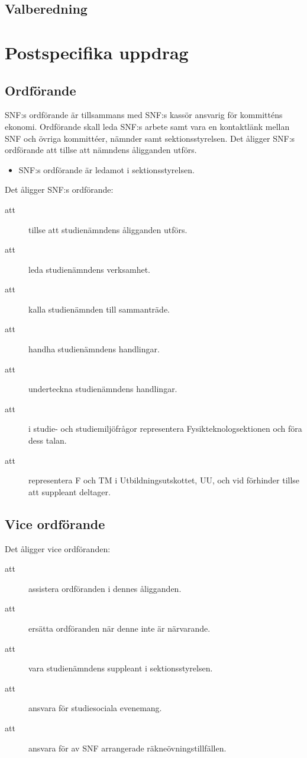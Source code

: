 \documentclass[a4paper]{article}
\begin{document}
\begin{foreningenv}{\forening{}}
    \subsection{Valberedning}
    \aliggvalber{}
    
    \section{Postspecifika uppdrag}
    \subsection{Ordförande}
    SNF:s ordförande är tillsammans med SNF:s kassör ansvarig för kommitténs ekonomi. Ordförande skall leda SNF:s arbete samt vara en kontaktlänk mellan SNF och övriga kommittéer, nämnder samt sektionsstyrelsen. Det åligger SNF:s ordförande att tillse att nämndens åligganden utförs.\\
    
    \begin{itemize}
        \item SNF:s ordförande är ledamot i sektionsstyrelsen.
    \end{itemize}
    
    Det åligger SNF:s ordförande:
    \begin{description}
        \item[att] tillse att studienämndens åligganden utförs. 
        \item[att] leda studienämndens verksamhet.
        \item[att] kalla studienämnden till sammanträde.
        \item[att] handha studienämndens handlingar.
        \item[att] underteckna studienämndens handlingar.
        \item[att] i studie- och studiemiljöfrågor representera Fysikteknologsektionen och föra dess talan.
        \item[att] representera F och TM i Utbildningsutskottet, UU, och vid förhinder tillse att suppleant deltager.
    \end{description}
        
    \subsection{Vice ordförande}
    Det åligger vice ordföranden:
    \begin{description}
        \item[att] assistera ordföranden i dennes åligganden.
        \item[att] ersätta ordföranden när denne inte är närvarande. 
        \item[att] vara studienämndens suppleant i sektionsstyrelsen.
        \item[att] ansvara för studiesociala evenemang.
        \item[att] ansvara för av SNF arrangerade räkneövningstillfällen.
    \end{description}
    

\end{foreningenv}
\end{document}
